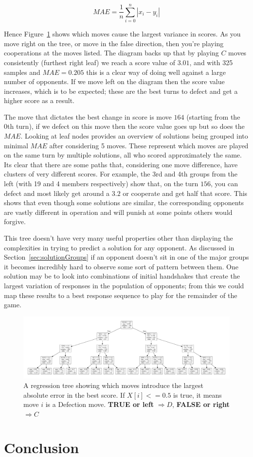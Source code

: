 $$MAE = \frac{1}{n}\sum_{i=0}^n |x_i-y_i|$$

Hence Figure~\ref{fig:reg_tree} shows which moves cause the largest variance in scores.
As you move right on the tree, or move in the false direction, then you're playing cooperations at the moves listed. 
The diagram backs up that by playing $C$ moves consistently (furthest right leaf) we reach a score value of $3.01$, and with 325 samples and $MAE=0.205$ this is a clear way of doing well against a large number of opponents.
If we move left on the diagram then the score value increases, which is to be expected; these are the best turns to defect and get a higher score as a result.

The move that dictates the best change in score is move $164$ (starting from the 0th turn), if we defect on this move then the score value goes up but so does the $MAE$.
Looking at leaf nodes provides an overview of solutions being grouped into minimal $MAE$ after considering 5 moves.
These represent which moves are played on the same turn by multiple solutions, all who scored approximately the same.
Its clear that there are some paths that, considering one move difference, have clusters of very different scores. 
For example, the 3rd and 4th groups from the left (with 19 and 4 members respectively) show that, on the turn $156$, you can defect and most likely get around a $3.2$ or cooperate and get half that score.
This shows that even though some solutions are similar, the corresponding opponents are vastly different in operation and will punish at some points others would forgive.

This tree doesn't have very many useful properties other than displaying the complexities in trying to predict a solution for any opponent.
As discussed in Section~\ref{sec:solutionGroups} if an opponent doesn't sit in one of the major groups it becomes incredibly hard to observe some sort of pattern between them.
One solution may be to look into combinations of initial handshakes that create the largest variation of responses in the population of opponents; from this we could map these results to a best response sequence to play for the remainder of the game.

\begin{figure}
    \includegraphics[width=1.0\textwidth, center]{./img/descriptive/reg_tree.pdf}
    \centering
    \caption{A regression tree showing which moves introduce the largest absolute error in the best score. If $X[i]<=0.5$ is true, it means move $i$ is a Defection move.
    \textbf{TRUE or left} $\Rightarrow D$, \textbf{FALSE or right} $\Rightarrow C$}
    \label{fig:reg_tree}
\end{figure}


\section{Conclusion}